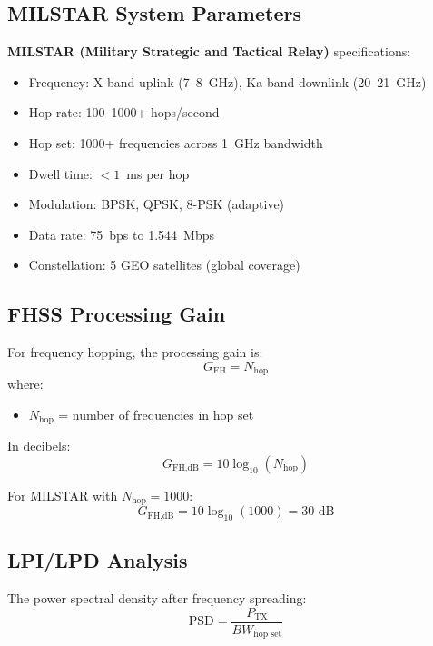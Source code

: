 \subsection{MILSTAR System Parameters}

\textbf{MILSTAR (Military Strategic and Tactical Relay)} specifications:
\begin{itemize}
\item Frequency: X-band uplink (7--8~GHz), Ka-band downlink (20--21~GHz)
\item Hop rate: 100--1000+ hops/second
\item Hop set: 1000+ frequencies across 1~GHz bandwidth
\item Dwell time: $<1$~ms per hop
\item Modulation: BPSK, QPSK, 8-PSK (adaptive)
\item Data rate: 75~bps to 1.544~Mbps
\item Constellation: 5 GEO satellites (global coverage)
\end{itemize}

\subsection{FHSS Processing Gain}

For frequency hopping, the processing gain is:
\begin{equation}
G_{\text{FH}} = N_{\text{hop}}
\end{equation}
where:
\begin{itemize}
\item $N_{\text{hop}}$ = number of frequencies in hop set
\end{itemize}

In decibels:
\begin{equation}
G_{\text{FH,dB}} = 10 \log_{10}(N_{\text{hop}})
\end{equation}

For MILSTAR with $N_{\text{hop}} = 1000$:
\begin{equation}
G_{\text{FH,dB}} = 10 \log_{10}(1000) = 30 \text{ dB}
\end{equation}

\subsection{LPI/LPD Analysis}

The power spectral density after frequency spreading:
\begin{equation}
\text{PSD} = \frac{P_{\text{TX}}}{BW_{\text{hop set}}}
\end{equation}

